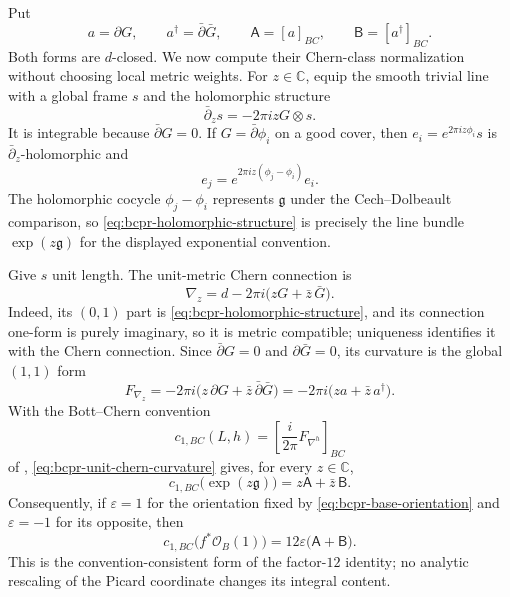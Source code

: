 Put
\begin{equation}
 a=\partial G,
 \qquad a^\dagger=\bar\partial\bar G,
 \qquad
 \mathsf A=[a]_{BC},
 \qquad \mathsf B=[a^\dagger]_{BC}.
\label{eq:bcpr-a-b-definitions}
\end{equation}
Both forms are $d$-closed.  We now compute their Chern-class normalization
without choosing local metric weights.  For $z\in\mathbb C$, equip the
smooth trivial line with a global frame $s$ and the holomorphic structure
\begin{equation}
 \bar\partial_zs=-2\pi i zG\otimes s.
\label{eq:bcpr-holomorphic-structure}
\end{equation}
It is integrable because $\bar\partial G=0$.  If
$G=\bar\partial\phi_i$ on a good cover, then
$e_i=e^{2\pi iz\phi_i}s$ is $\bar\partial_z$-holomorphic and
\[
 e_j=e^{2\pi iz(\phi_j-\phi_i)}e_i.
\]
The holomorphic cocycle $\phi_j-\phi_i$ represents $\mathfrak g$ under
the Cech--Dolbeault comparison, so
\cref{eq:bcpr-holomorphic-structure} is precisely the line bundle
$\exp(z\mathfrak g)$ for the displayed exponential convention.

Give $s$ unit length.  The unit-metric Chern connection is
\begin{equation}
 \nabla_z=d-2\pi i\bigl(zG+\bar z\,\bar G\bigr).
\label{eq:bcpr-unit-chern-connection}
\end{equation}
Indeed, its $(0,1)$ part is
\cref{eq:bcpr-holomorphic-structure}, and its connection one-form is
purely imaginary, so it is metric compatible; uniqueness identifies it
with the Chern connection.  Since $\bar\partial G=0$ and
$\partial\bar G=0$, its curvature is the global $(1,1)$ form
\begin{equation}
 F_{\nabla_z}
 =-2\pi i\bigl(z\,\partial G+
                 \bar z\,\bar\partial\bar G\bigr)
 =-2\pi i\bigl(za+\bar z\,a^\dagger\bigr).
\label{eq:bcpr-unit-chern-curvature}
\end{equation}
With the Bott--Chern convention
\begin{equation}
 c_{1,BC}(L,h)=
 \left[\frac{i}{2\pi}F_{\nabla^h}\right]_{BC}
\label{eq:bcpr-chern-convention}
\end{equation}
of \cite[\S8.a]{Schweitzer2007},
\cref{eq:bcpr-unit-chern-curvature} gives, for every $z\in\mathbb C$,
\begin{equation}
 c_{1,BC}\bigl(\exp(z\mathfrak g)\bigr)
 =z\mathsf A+\bar z\,\mathsf B.
\label{eq:bcpr-chern-exp-identity}
\end{equation}
Consequently, if $\varepsilon=1$ for the orientation fixed by
\cref{eq:bcpr-base-orientation} and $\varepsilon=-1$ for its opposite,
then
\begin{equation}
 c_{1,BC}\bigl(f^*\mathcal O_B(1)\bigr)
 =12\varepsilon\bigl(\mathsf A+\mathsf B\bigr).
\label{eq:bcpr-c1-pullback}
\end{equation}
This is the convention-consistent form of the factor-$12$ identity; no
analytic rescaling of the Picard coordinate changes its integral content.

